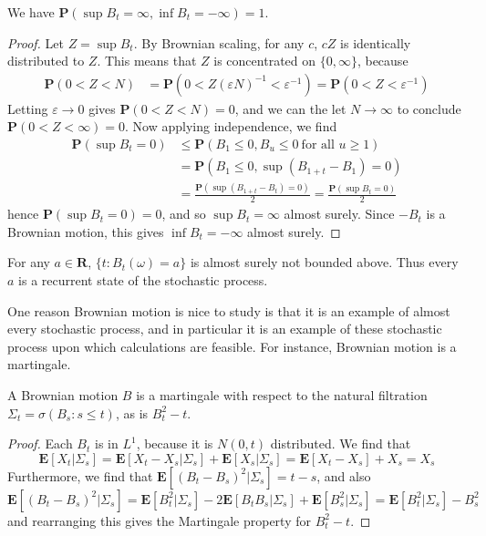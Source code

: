 \begin{lemma}
    We have $\mathbf{P} \left( \sup B_t = \infty, \inf B_t = -\infty \right) = 1$.
\end{lemma}
\begin{proof}
    Let $Z = \sup B_t$. By Brownian scaling, for any $c$, $cZ$ is identically distributed to $Z$. This means that $Z$ is concentrated on $\{ 0, \infty \}$, because
    \begin{align*}
        \mathbf{P}(0 < Z < N) &= \mathbf{P}\left(0 < Z(\varepsilon N)^{-1} < \varepsilon^{-1} \right) = \mathbf{P}(0 < Z < \varepsilon^{-1})
    \end{align*}
    Letting $\varepsilon \to 0$ gives $\mathbf{P}(0 < Z < N) = 0$, and we can the let $N \to \infty$ to conclude $\mathbf{P}(0 < Z < \infty) = 0$. Now applying independence, we find
    \begin{align*}
        \mathbf{P}(\sup B_t = 0) &\leq \mathbf{P}(B_1 \leq 0, B_u \leq 0\ \text{for all $u \geq 1$})\\
        &= \mathbf{P}(B_1 \leq 0, \sup(B_{1 + t} - B_1) = 0)\\
        &= \frac{\mathbf{P}(\sup(B_{1+t} - B_t) = 0)}{2} = \frac{\mathbf{P}(\sup B_t = 0)}{2}
    \end{align*}
    hence $\mathbf{P}(\sup B_t = 0) = 0$, and so $\sup B_t = \infty$ almost surely. Since $-B_t$ is a Brownian motion, this gives $\inf B_t = -\infty$ almost surely.
\end{proof}

\begin{corollary}
    For any $a \in \mathbf{R}$, $\{ t: B_t(\omega) = a \}$ is almost surely not bounded above. Thus every $a$ is a recurrent state of the stochastic process.
\end{corollary}

One reason Brownian motion is nice to study is that it is an example of almost every stochastic process, and in particular it is an example of these stochastic process upon which calculations are feasible. For instance, Brownian motion is a martingale.

\begin{theorem}
    A Brownian motion $B$ is a martingale with respect to the natural filtration $\Sigma_t = \sigma(B_s: s \leq t)$, as is $B_t^2 - t$.
\end{theorem}
\begin{proof}
    Each $B_t$ is in $L^1$, because it is $N(0,t)$ distributed.  We find that
    \[ \mathbf{E}[X_t | \Sigma_s] = \mathbf{E}[X_t - X_s | \Sigma_s] + \mathbf{E}[X_s|\Sigma_s] = \mathbf{E}[X_t - X_s] + X_s = X_s \]
    Furthermore, we find that $\mathbf{E}[(B_t - B_s)^2|\Sigma_s] = t-s$, and also
    \[ \mathbf{E}[(B_t - B_s)^2 | \Sigma_s] = \mathbf{E}[B_t^2|\Sigma_s] - 2\mathbf{E}[B_tB_s|\Sigma_s] + \mathbf{E}[B_s^2|\Sigma_s] = \mathbf{E}[B_t^2|\Sigma_s] - B_s^2 \]
    and rearranging this gives the Martingale property for $B_t^2 - t$.
\end{proof}

